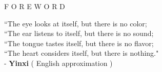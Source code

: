 \documentclass[12pt]{article}
\begin{document}
\begingroup
\begin{center}
\end{center}
\endgroup

\vspace{15\baselineskip}

\begingroup
\begin{center}
\huge F O R E W O R D
\end{center}
\endgroup

\vspace{3\baselineskip}

\begingroup
``The eye looks at itself, but there is no color;\\
``The ear listens to itself, but there is no sound;\\
``The tongue tastes itself, but there is no flavor;\\
``The heart considers itself, but there is nothing."\\
\phantom{text} \hfill - \textbf{Yinxi} ( English approximation ) \\
\endgroup
\end{document}
